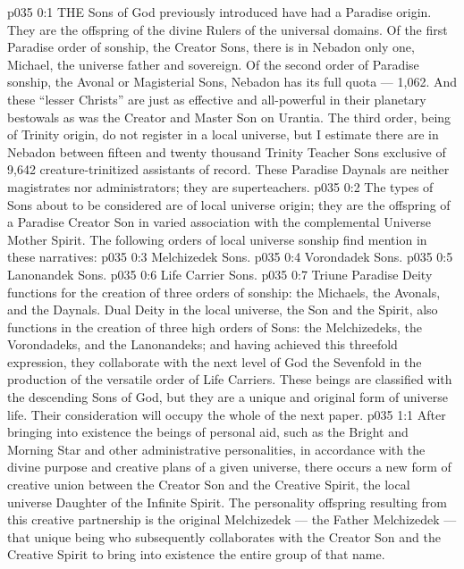 \vs p035 0:1 THE Sons of God previously introduced have had a Paradise origin. They are the offspring of the divine Rulers of the universal domains. Of the first Paradise order of sonship, the Creator Sons, there is in Nebadon only one, Michael, the universe father and sovereign. Of the second order of Paradise sonship, the Avonal or Magisterial Sons, Nebadon has its full quota --- 1,062. And these “lesser Christs” are just as effective and all\hyp{}powerful in their planetary bestowals as was the Creator and Master Son on Urantia. The third order, being of Trinity origin, do not register in a local universe, but I estimate there are in Nebadon between fifteen and twenty thousand Trinity Teacher Sons exclusive of 9,642 creature\hyp{}trinitized assistants of record. These Paradise Daynals are neither magistrates nor administrators; they are superteachers.
\vs p035 0:2 The types of Sons about to be considered are of local universe origin; they are the offspring of a Paradise Creator Son in varied association with the complemental Universe Mother Spirit. The following orders of local universe sonship find mention in these narratives:
\vs p035 0:3 \bibnobreakspace Melchizedek Sons.
\vs p035 0:4 \bibnobreakspace Vorondadek Sons.
\vs p035 0:5 \bibnobreakspace Lanonandek Sons.
\vs p035 0:6 \bibnobreakspace Life Carrier Sons.
\vs p035 0:7 \pc Triune Paradise Deity functions for the creation of three orders of sonship: the Michaels, the Avonals, and the Daynals. Dual Deity in the local universe, the Son and the Spirit, also functions in the creation of three high orders of Sons: the Melchizedeks, the Vorondadeks, and the Lanonandeks; and having achieved this threefold expression, they collaborate with the next level of God the Sevenfold in the production of the versatile order of Life Carriers. These beings are classified with the descending Sons of God, but they are a unique and original form of universe life. Their consideration will occupy the whole of the next paper.
\vs p035 1:1 After bringing into existence the beings of personal aid, such as the Bright and Morning Star and other administrative personalities, in accordance with the divine purpose and creative plans of a given universe, there occurs a new form of creative union between the Creator Son and the Creative Spirit, the local universe Daughter of the Infinite Spirit. The personality offspring resulting from this creative partnership is the original Melchizedek --- the Father Melchizedek --- that unique being who subsequently collaborates with the Creator Son and the Creative Spirit to bring into existence the entire group of that name.
